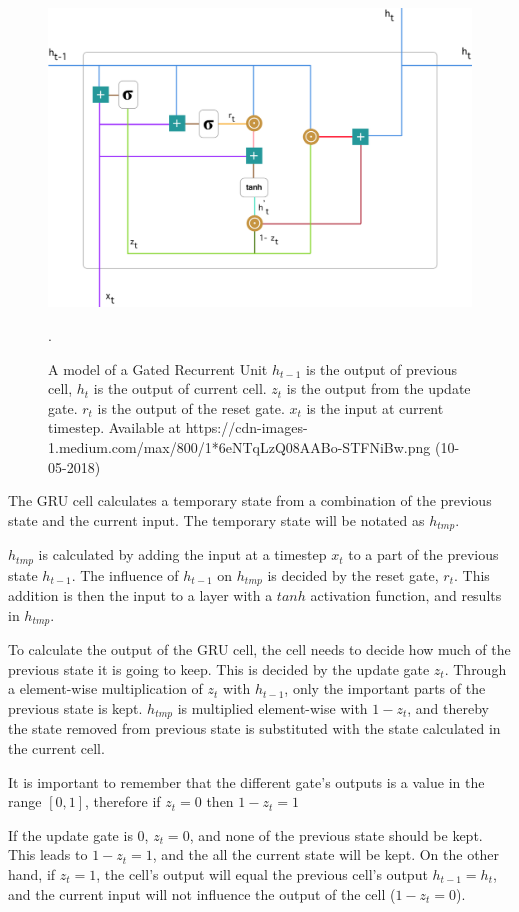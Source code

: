 \begin{figure}[H]
    \centering
    \includegraphics[width=\textwidth]{Assets/Chapter2_Theory/GRU-cell.png}
    \caption{A model of a Gated Recurrent Unit $h_{t-1}$ is the output of previous cell, $h_t$ is the output of current cell. $z_t$ is the output from the update gate. $r_t$ is the output of the reset gate. $x_t$ is the input at current timestep. Available at https://cdn-images-1.medium.com/max/800/1*6eNTqLzQ08AABo-STFNiBw.png (10-05-2018) \cite{kostadinov_understanding_2017}}.  
    \label{fig:gru-single-cell}
\end{figure}

The GRU cell calculates a temporary state from a combination of the previous state and the current input. The temporary state will be notated as $h_{tmp}$.

$h_{tmp}$ is calculated by adding the input at a timestep $x_t$ to a part of the previous state $h_{t-1}$. The influence of $h_{t-1}$ on $h_{tmp}$ is decided by the reset gate, $r_t$. This addition is then the input to a layer with a $tanh$ activation function, and results in $h_{tmp}$.

To calculate the output of the GRU cell, the cell needs to decide how much of the previous state it is going to keep. This is decided by the update gate $z_t$. Through a element-wise multiplication of $z_t$ with $h_{t-1}$, only the important parts of the previous state is kept. $h_{tmp}$ is multiplied element-wise with $1 - z_t$, and thereby the state removed from previous state is substituted with the state calculated in the current cell.

It is important to remember that the different gate's outputs is a value in the range $[0, 1]$, therefore if $z_t = 0$ then $1 - z_t = 1$

If the update gate is 0, $z_t = 0$, and none of the previous state should be kept. This leads to $1 - z_t = 1$, and the all the current state will be kept. On the other hand, if $z_t = 1$, the cell's output will equal the previous cell's output $h_{t-1} = h_t$, and the current input will not influence the output of the cell ($1 - z_t = 0$). \cite{kostadinov_understanding_2017}